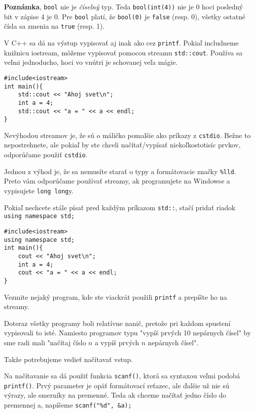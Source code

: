 \medskip

\textbf{Poznámka}, \verb!bool! nie je \textit{číselný} typ. Teda \verb!bool(int(4))! nie
je 0 hoci posledný bit v zápise 4 je 0.  Pre \verb!bool! platí, že
\verb!bool(0)! je \verb!false! (resp. 0), všetky ostatné čísla sa zmenia na
\verb!true! (resp. 1).


V C++ sa dá na výstup vypisovať aj inak ako cez \verb!printf!. Pokiaľ
includneme knižnicu iostream, môžeme vypisovať pomocou streamu
\verb!std::cout!. Používa sa veľmi jednoducho, hoci vo vnútri je schovanej veľa
mágie.

\begin{lstlisting}
#include<iostream>
int main(){
    std::cout << "Ahoj svet\n";
    int a = 4;
    std::cout << "a = " << a << endl;
}
\end{lstlisting}

Nevýhodou streamov je, že sú o máličko pomalšie ako príkazy z \verb!cstdio!. Bežne
to nepostrehnete, ale pokiaľ by ste chceli načítať/vypísať niekoľkostotisíc
prvkov, odporúčame použiť \verb!cstdio!.

Jednou z výhod je, že sa nemusíte starať o typy a formátovacie značky
\verb"%lld". Preto vám odporúčame používať streamy, ak programujete na Windowse
a vypisujete \verb!long long!y.

Pokiaľ nechcete stále písať pred každým príkazom \verb!std::!, stačí pridať
riadok \verb!using namespace std;!

\begin{lstlisting}
#include<iostream>
using namespace std;
int main(){
    cout << "Ahoj svet\n";
    int a = 4;
    cout << "a = " << a << endl;
}
\end{lstlisting}

\cvicenie Vezmite nejaký program, kde ste viackrát použili \verb!printf! a
prepíšte ho na streamy.
\fakeriesenie


Doteraz všetky programy boli relatívne nanič, pretože pri každom spustení
vypisovali to isté.  Namiesto programov typu "vypíš prvých 10 nepárnych čísel"
by sme radi mali "načítaj číslo $n$ a vypíš prvých $n$ nepárnych čísel".

Takže potrebujeme vedieť načítavať vstup.

Na načítavanie sa dá použiť funkcia \verb!scanf()!, ktorá sa syntaxou veľmi
podobá \verb!printf()!. Prvý parameter je opäť formátovací reťazec, ale ďalšie
už nie sú výrazy, ale smerníky na premenné. Teda ak chceme načítať jedno číslo
do premennej a, napíšeme \verb!scanf("%d", &a);!

